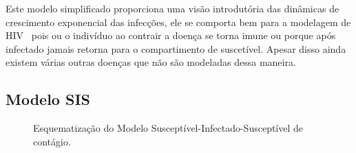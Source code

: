 Este modelo simplificado proporciona uma visão introdutória das dinâmicas de crescimento exponencial das infecções, ele se comporta bem 
para a modelagem de HIV~\cite{modelos} pois ou o indivíduo ao contrair a doença se torna imune ou porque após infectado jamais retorna para o compartimento de suscetível. Apesar disso ainda existem várias outras doenças que não são modeladas dessa maneira.

\subsection{Modelo SIS}

\begin{figure}[ht]
  \centering
  
  \captionsetup{font=normalsize,skip=0.8pt,singlelinecheck=on,labelsep=endash}
  \caption{Esquematização do Modelo Susceptível-Infectado-Susceptível de contágio.} 
  \label{img:SIS_}
\end{figure}

